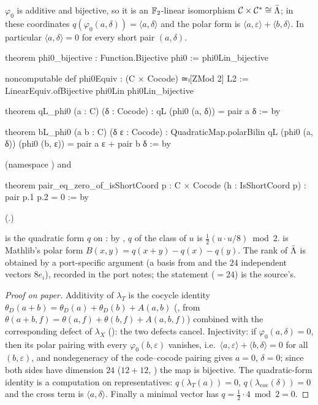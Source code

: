 \begin{theorem}\label{ch21:thm:phi0}
$\varphi_0$ is additive and bijective, so it is an $\mathbb{F}_2$-linear isomorphism
$\mathcal{C}\times\mathcal{C}^*\cong\bar{\Lambda}$; in these coordinates $q(\varphi_0(a,\delta))=\langle a,\delta\rangle$
and the polar form is $\langle a,\varepsilon\rangle+\langle b,\delta\rangle$.  In particular
$\langle a,\delta\rangle=0$ for every short pair $(a,\delta)$.
\end{theorem}
\begin{leancode}
theorem phi0_bijective : Function.Bijective phi0 := phi0Lin_bijective
\end{leancode}
\begin{leancode}
noncomputable def phi0Equiv : (C × Cocode) ≃ₗ[ZMod 2] L2 :=
  LinearEquiv.ofBijective phi0Lin phi0Lin_bijective
\end{leancode}
\begin{leancode}
theorem qL_phi0 (a : C) (δ : Cocode) : qL (phi0 (a, δ)) = pair a δ := by
\end{leancode}
\begin{leancode}
theorem bL_phi0 (a b : C) (δ ε : Cocode) :
    QuadraticMap.polarBilin qL (phi0 (a, δ)) (phi0 (b, ε)) = pair a ε + pair b δ := by
\end{leancode}
(namespace ) and
\begin{leancode}
theorem pair_eq_zero_of_isShortCoord {p : C × Cocode} (h : IsShortCoord p) : pair p.1 p.2 = 0 := by
\end{leancode}
(.)
\begin{dictionary}
 is the quadratic form $q$ on : by , $q$ of the class of $u$ is
$\tfrac12(u\cdot u/8)\bmod2$.   is Mathlib's polar form
$B(x,y)=q(x+y)-q(x)-q(y)$.  The rank of $\bar{\Lambda}$ is obtained by a port-specific argument (a basis
from  and the $24$ independent vectors $8e_i$), recorded in the port notes;
the statement  ($=24$) is the source's.
\end{dictionary}
\begin{proof}[Proof on paper]
Additivity of $\lambda_T$ is the cocycle identity $\theta_D(a+b)=\theta_D(a)+\theta_D(b)+A(a,b)$
(, from $\theta(a+b,f)=\theta(a,f)+\theta(b,f)+A(a,b,f)$) combined with the
corresponding defect of $\lambda_X$ (): the two defects cancel.  Injectivity:
if $\varphi_0(a,\delta)=0$, then its polar pairing with every $\varphi_0(b,\varepsilon)$ vanishes,
i.e.\ $\langle a,\varepsilon\rangle+\langle b,\delta\rangle=0$ for all $(b,\varepsilon)$, and
nondegeneracy of the code--cocode pairing gives $a=0$, $\delta=0$; since both sides have dimension
$24$ ($12+12$, ) the map is bijective.  The quadratic-form identity is a
computation on representatives: $q(\lambda_T(a))=0$, $q(\lambda_{\mathrm{coc}}(\delta))=0$ and the
cross term is $\langle a,\delta\rangle$.  Finally a minimal vector has $q=\tfrac12\cdot4\bmod2=0$.
\end{proof}
